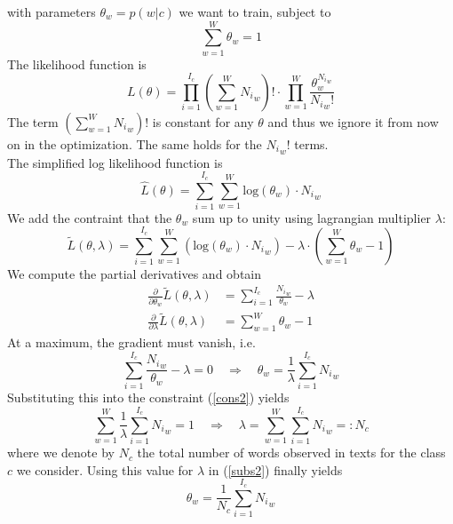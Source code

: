 \documentclass[%
   11pt,              %
   ngerman,           %
   a4paper,           %
   DIV11,             %
]{scrartcl}%
\begin{document}
with parameters $\theta_w = p(w|c)$ we want to train, subject to
\begin{equation}\label{cons2}
	\sum_{w=1}^W \theta_w = 1
\end{equation}
The likelihood function is 
\begin{equation*}
	L(\theta) = \prod_{i=1}^{I_c} (\sum_{w=1}^W {N_i}_w)! \cdot \prod_{w=1}^W \frac{\theta_w^{{N_i}_w}}{{N_i}_w !}
\end{equation*}
The term $(\sum_{w=1}^W {N_i}_w)!$ is constant for any $\theta$ and thus we ignore it from now on in the optimization. The same holds for the ${N_i}_w !$ terms.\\
The simplified log likelihood function is
\begin{equation*}
	\hat{L}(\theta) = \sum_{i=1}^{I_c} \sum_{w=1}^W \text{log}(\theta_w) \cdot {N_i}_w
\end{equation*}
We add the contraint that the $\theta_w$ sum up to unity using lagrangian multiplier $\lambda$:
\begin{equation*}
	\tilde{L}(\theta, \lambda) = \sum_{i=1}^{I_c} \sum_{w=1}^W (\text{log}(\theta_w) \cdot {N_i}_w) - \lambda \cdot (\sum_{w=1}^W \theta_w - 1)
\end{equation*}
We compute the partial derivatives and obtain
\begin{align*}
	\frac{\partial}{\partial \theta_w} \tilde{L}(\theta, \lambda) &=  \sum_{i=1}^{I_c} \frac{{N_i}_w}{\theta_w} - \lambda\\
	\frac{\partial}{\partial \lambda} \tilde{L}(\theta, \lambda) &= \sum_{w=1}^W \theta_w - 1
\end{align*}
At a maximum, the gradient must vanish, i.e.
\begin{equation}\label{subs2}
	\sum_{i=1}^{I_c} \frac{{N_i}_w}{\theta_w} - \lambda = 0 \quad \Rightarrow \quad \theta_w = \frac{1}{\lambda} \sum_{i=1}^{I_c} {N_i}_w
\end{equation}
Substituting this into the constraint (\ref{cons2}) yields
\begin{equation*}
	\sum_{w=1}^W \frac{1}{\lambda} \sum_{i=1}^{I_c} {N_i}_w = 1 \quad \Rightarrow \quad \lambda = \sum_{w=1}^W \sum_{i=1}^{I_c} {N_i}_w =: N_c
\end{equation*}
where we denote by $N_c$ the total number of words observed in texts for the class $c$ we consider. Using this value for $\lambda$ in (\ref{subs2}) finally yields
\begin{equation*}
	\theta_w = \frac{1}{N_c} \sum_{i=1}^{I_c} {N_i}_w
\end{equation*}
\end{document}
